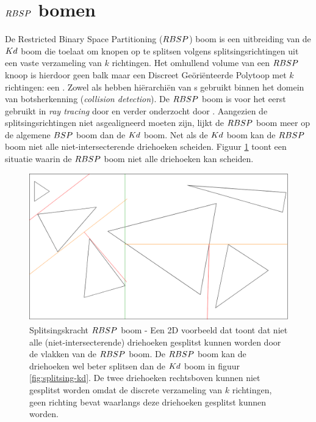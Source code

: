 \section{$\symRBSP$ bomen}
    De Restricted Binary Space Partitioning ($\symRBSP$) boom is een uitbreiding van de $Kd$ boom die toelaat om knopen op te splitsen volgens splitsingsrichtingen uit een vaste verzameling van $k$ richtingen.
    Het omhullend volume van een $\symRBSP$ knoop is hierdoor geen balk maar een Discreet Geöriënteerde Polytoop met $k$ richtingen: een \symKDOP.
    Zowel \authorKlosowki{} \cite{klosowski1998efficient} als \authorZachmann{} \cite{zachmann1998rapid} hebben hiërarchiën van \symKDOP s gebruikt binnen het domein van botsherkenning (\textit{collision detection}).
    De $\symRBSP$ boom is voor het eerst gebruikt in \textit{ray tracing} door \authorKammaje{} \cite{Kammaje} en verder onderzocht door \authorBudge{} \cite{Budge}.
    Aangezien de splitsingsrichtingen niet asgealigneerd moeten zijn, lijkt de $\symRBSP$ boom meer op de algemene $BSP$ boom dan de $Kd$ boom. Net als de $Kd$ boom kan de $\symRBSP$ boom niet alle niet-intersecterende driehoeken scheiden. 
    Figuur \ref{fig:splitsing-rbsp} toont een situatie waarin de $\symRBSP$ boom niet alle driehoeken kan scheiden.
    \\

    \begin{figure}
        \centering
        \includegraphics[width=\linewidth]{img/splitsing-RBSP}
        \caption[Splitsingskracht $\symRBSP$ boom]{Splitsingskracht $\symRBSP$ boom - \small Een 2D voorbeeld dat toont dat niet alle (niet-intersecterende) driehoeken gesplitst kunnen worden door de vlakken van de $\symRBSP$ boom. De $\symRBSP$ boom kan de driehoeken wel beter splitsen dan de $Kd$ boom in figuur \ref{fig:splitsing-kd}. De twee driehoeken rechtsboven kunnen niet gesplitst worden omdat de discrete verzameling van $k$ richtingen, geen richting bevat waarlangs deze driehoeken gesplitst kunnen worden.}
        \label{fig:splitsing-rbsp}    
    \end{figure}

